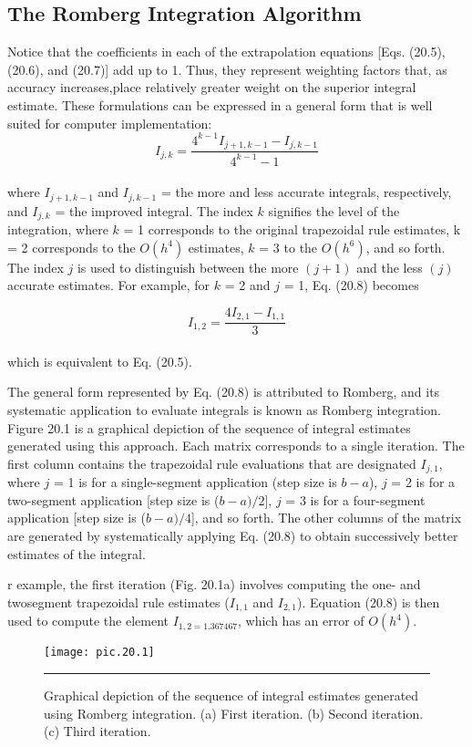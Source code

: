 \documentclass[../main.tex]{subfiles}
\begin{document}
\subsection{The Romberg Integration Algorithm}
Notice that the coefficients in each of the extrapolation equations [Eqs. (20.5), (20.6), and
(20.7)] add up to 1. Thus, they represent weighting factors that, as accuracy increases,place relatively greater weight on the superior integral estimate. These formulations can be
expressed in a general form that is well suited for computer implementation:
\begin{equation}
	\tag{20.8}
	I_{j,k}=\dfrac{4^{k-1}I_{j+1,k-1}-I_{j,k-1}}{4^{k-1}-1}
\end{equation}\\
where $I_{j+1,k−1}$ and $I_{j,k−1}$ = the more and less accurate integrals, respectively, and $I_{j,k}$ =
the improved integral. The index $k$ signifies the level of the integration, where $k$ = 1 corresponds to the original trapezoidal rule estimates, k = 2 corresponds to the $O(h^4)$ estimates, $k$ = 3 to the $O(h^6)$, and so forth. The index $j$ is used to distinguish between the more
$(j + 1)$ and the less $(j)$ accurate estimates. For example, for $k$ = 2 and $j$ = 1, Eq. (20.8)
becomes

	$$I_{1,2}=\dfrac{4I_{2,1}-I_{1,1}}{3}$$\\
which is equivalent to Eq. (20.5).

The general form represented by Eq. (20.8) is attributed to Romberg, and its systematic application to evaluate integrals is known as Romberg integration. Figure 20.1 is a
graphical depiction of the sequence of integral estimates generated using this approach.
Each matrix corresponds to a single iteration. The first column contains the trapezoidal rule
evaluations that are designated $I_{j,1}$, where $j$ = 1 is for a single-segment application (step
size is $b − a$), $j$ = 2 is for a two-segment application [step size is ($b − a)/2$], $j$ = 3 is for
a four-segment application [step size is ($b − a)/4$], and so forth. The other columns of the
matrix are generated by systematically applying Eq. (20.8) to obtain successively better
estimates of the integral.

r example, the first iteration (Fig. 20.1a) involves computing the one- and twosegment trapezoidal rule estimates ($I_{1,1}$ and $I_{2,1}$). Equation (20.8) is then used to compute
the element $I_{1,2 = 1.367467}$, which has an error of $O(h^4)$.
\pagebreak

\begin{figure}[hbt!]
	\centering
	\texttt{[image: pic.20.1]}
	\caption{\textsf{Graphical depiction of the sequence of integral estimates generated using Romberg integration.
(a) First iteration. (b) Second iteration. (c) Third iteration.}} \hrule
	\label{pic.20.1}
\end{figure}
\vspace{0.3in}
\end{document}

